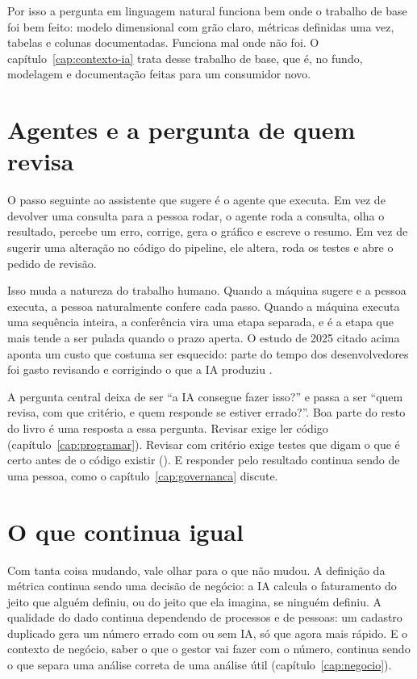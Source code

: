 Por isso a pergunta em linguagem natural funciona bem onde o trabalho de base foi bem
feito: modelo dimensional com grão claro, métricas definidas uma vez, tabelas e colunas
documentadas. Funciona mal onde não foi. O capítulo~\ref{cap:contexto-ia} trata desse
trabalho de base, que é, no fundo, modelagem e documentação feitas para um consumidor
novo.

\section{Agentes e a pergunta de quem revisa}
\label{sec:agentes}

O passo seguinte ao assistente que sugere é o agente que executa. Em vez de devolver
uma consulta para a pessoa rodar, o agente roda a consulta, olha o resultado, percebe um
erro, corrige, gera o gráfico e escreve o resumo. Em vez de sugerir uma alteração no
código do pipeline, ele altera, roda os testes e abre o pedido de revisão.

Isso muda a natureza do trabalho humano. Quando a máquina sugere e a pessoa executa, a
pessoa naturalmente confere cada passo. Quando a máquina executa uma sequência inteira,
a conferência vira uma etapa separada, e é a etapa que mais tende a ser pulada quando o
prazo aperta. O estudo de 2025 citado acima aponta um custo que costuma ser esquecido:
parte do tempo dos desenvolvedores foi gasto revisando e corrigindo o que a IA produziu
\parencite{becker2025}.

A pergunta central deixa de ser \enquote{a IA consegue fazer isso?} e passa a ser
\enquote{quem revisa, com que critério, e quem responde se estiver errado?}. Boa parte
do resto do livro é uma resposta a essa pergunta. Revisar exige ler código
(capítulo~\ref{cap:programar}). Revisar com critério exige testes que digam o que é
certo antes de o código existir (). E responder pelo resultado continua
sendo de uma pessoa, como o capítulo~\ref{cap:governanca} discute.

\section{O que continua igual}
\label{sec:continua-igual}

Com tanta coisa mudando, vale olhar para o que não mudou. A definição da métrica
continua sendo uma decisão de negócio: a IA calcula o faturamento do jeito que alguém
definiu, ou do jeito que ela imagina, se ninguém definiu. A qualidade do dado continua
dependendo de processos e de pessoas: um cadastro duplicado gera um número errado com ou
sem IA, só que agora mais rápido. E o contexto de negócio, saber o que o gestor vai fazer
com o número, continua sendo o que separa uma análise correta de uma análise útil
(capítulo~\ref{cap:negocio}).


